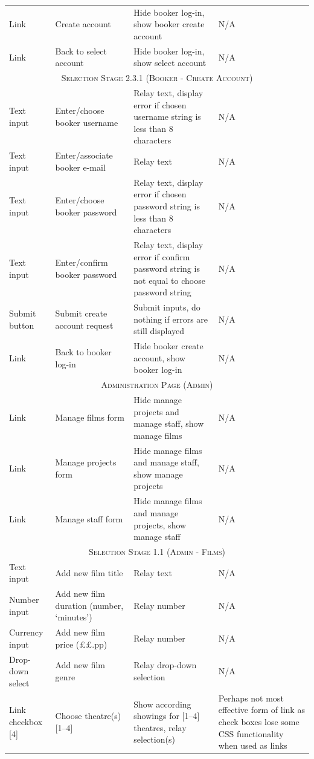\documentclass[11pt, english]{article}
\begin{document}
\begin{center}
\begin{longtable}{p{3cm}p{3cm}p{4cm}p{3cm}}
		Link & Create account & Hide booker log-in, show booker create account & N/A\\
		Link & Back to select account & Hide booker log-in, show select account & N/A\\
		\hline
		\multicolumn{4}{c}{\textsc{Selection Stage 2.3.1 (Booker - Create Account)}}\\
		\hline
		Text input & Enter/choose booker username & Relay text, display error if chosen username string is less than 8 characters & N/A\\
		Text input & Enter/associate booker e-mail & Relay text & N/A\\
		Text input & Enter/choose booker password & Relay text, display error if chosen password string is less than 8 characters & N/A\\
		Text input & Enter/confirm booker password & Relay text, display error if confirm password string is not equal to choose password string & N/A\\
		Submit button & Submit create account request & Submit inputs, do nothing if errors are still displayed & N/A\\
		Link & Back to booker log-in & Hide booker create account, show booker log-in & N/A\\
		\hline
		\hline
		\multicolumn{4}{c}{\textsc{Administration Page (Admin)}}\\
		\hline
		\hline
		Link & Manage films form & Hide manage projects and manage staff, show manage films & N/A\\
		Link & Manage projects form & Hide manage films and manage staff, show manage projects & N/A\\
		Link & Manage staff form & Hide manage films and manage projects, show manage staff & N/A\\
		\hline
		\multicolumn{4}{c}{\textsc{Selection Stage 1.1 (Admin - Films)}}\\
		\hline
		Text input & Add new film title & Relay text & N/A\\
		Number input & Add new film duration (number, `minutes') & Relay number & N/A\\
		Currency input & Add new film price (\pounds\pounds.pp) & Relay number & N/A\\
		Drop-down select & Add new film genre & Relay drop-down selection & N/A\\
		Link checkbox [4] & Choose theatre(s) [1--4] & Show according showings for [1--4] theatres, relay selection(s) & Perhaps not most effective form of link as check boxes lose some CSS functionality when used as links\\

\end{longtable}
\end{center}
\end{document}

